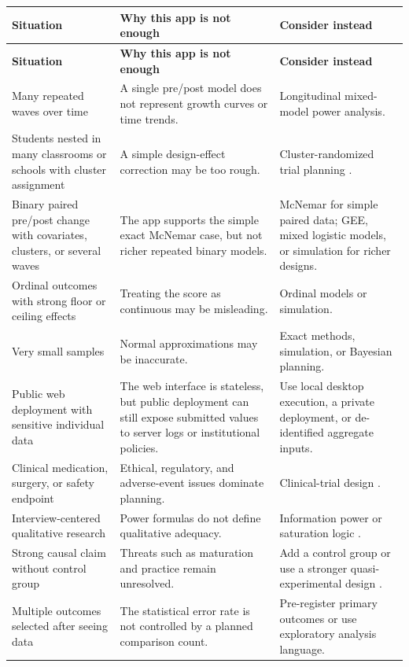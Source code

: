 \documentclass[11pt,a4paper,oneside]{report}
\begin{document}
{\small
\begin{longtable}{L{0.24\textwidth}L{0.34\textwidth}L{0.32\textwidth}}
\toprule
\textbf{Situation} & \textbf{Why this app is not enough} & \textbf{Consider instead}\\
\midrule
\endfirsthead
\toprule
\textbf{Situation} & \textbf{Why this app is not enough} & \textbf{Consider instead}\\
\midrule
\endhead
Many repeated waves over time & A single pre/post model does not represent growth curves or time trends. & Longitudinal mixed-model power analysis.\\
Students nested in many classrooms or schools with cluster assignment & A simple design-effect correction may be too rough. & Cluster-randomized trial planning \parencite{donner2000cluster}.\\
Binary paired pre/post change with covariates, clusters, or several waves & The app supports the simple exact McNemar case, but not richer repeated binary models. & McNemar for simple paired data; GEE, mixed logistic models, or simulation for richer designs.\\
Ordinal outcomes with strong floor or ceiling effects & Treating the score as continuous may be misleading. & Ordinal models or simulation.\\
Very small samples & Normal approximations may be inaccurate. & Exact methods, simulation, or Bayesian planning.\\
Public web deployment with sensitive individual data & The web interface is stateless, but public deployment can still expose submitted values to server logs or institutional policies. & Use local desktop execution, a private deployment, or de-identified aggregate inputs.\\
Clinical medication, surgery, or safety endpoint & Ethical, regulatory, and adverse-event issues dominate planning. & Clinical-trial design \parencite{julious2010sample}.\\
Interview-centered qualitative research & Power formulas do not define qualitative adequacy. & Information power or saturation logic \parencite{malterud2016information}.\\
Strong causal claim without control group & Threats such as maturation and practice remain unresolved. & Add a control group or use a stronger quasi-experimental design \parencite{shadish2002experimental}.\\
Multiple outcomes selected after seeing data & The statistical error rate is not controlled by a planned comparison count. & Pre-register primary outcomes or use exploratory analysis language.\\
\bottomrule
\end{longtable}
}
\end{document}
